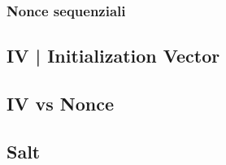 \subsubsection{Nonce sequenziali}


\textsf{\small }


\subsection{IV | Initialization Vector} %




\textsf{\small }

\subsection{IV vs Nonce} %

\textsf{\small }

\subsection{Salt} %



